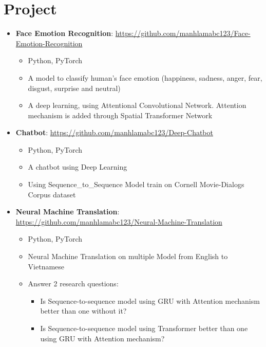 \documentclass[letterpaper,11pt]{article}
\newcommand{\resumeSubHeadingListStart}{\begin{itemize}[leftmargin=*]}
\newcommand{\resumeSubHeadingListEnd}{\end{itemize}}
\begin{document}
\section{Project}
 \resumeSubHeadingListStart
   \item \textbf{Face Emotion Recognition}{: \href{https://github.com/manhlamabc123/Face-Emotion-Recognition}{https://github.com/manhlamabc123/Face-Emotion-Recognition}}
   	\begin{itemize}
   	 \item Python, PyTorch
   	 \item A model to classify human's face emotion (happiness, sadness, anger, fear, disgust, surprise and neutral)
   	 \item A deep learning, using Attentional Convolutional Network. Attention mechanism is added through Spatial Transformer Network
   	\end{itemize}
   \item \textbf{Chatbot}{: \href{https://github.com/manhlamabc123/Deep-Chatbot}{https://github.com/manhlamabc123/Deep-Chatbot}}
   	\begin{itemize}
   	 \item Python, PyTorch
   	 \item A chatbot using Deep Learning
   	 \item Using Sequence\_to\_Sequence Model train on Cornell Movie-Dialogs Corpus dataset
   	\end{itemize}
	   \item \textbf{Neural Machine Translation}{: \href{https://github.com/manhlamabc123/Neural-Machine-Translation}{https://github.com/manhlamabc123/Neural-Machine-Translation}}
   	\begin{itemize}
   	 \item Python, PyTorch
   	 \item Neural Machine Translation on multiple Model from English to Vietnamese
   	 \item Answer 2 research questions:
   	 \begin{itemize}
		\item Is Sequence-to-sequence model using GRU with Attention mechanism better than one without it?
		\item Is Sequence-to-sequence model using Transformer better than one using GRU with Attention mechanism?
	 \end{itemize}
   	\end{itemize}
 \resumeSubHeadingListEnd

%
\end{document}
